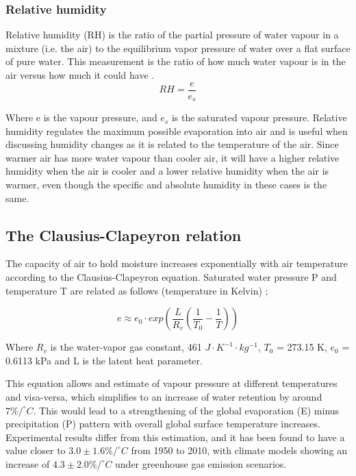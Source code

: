 \documentclass[12pt, oneside]{article}
\begin{document}
\subsubsection{Relative humidity}
Relative humidity (RH) is the ratio of the partial pressure of water vapour in a mixture (i.e. the air) to the equilibrium vapor pressure of water over a flat surface of pure water. This measurement is the ratio of how much water vapour is in the air versus how much it could have \cite[p.~92]{stull2015practical}.
\begin{equation}
    RH = \frac{e}{e_s}
\end{equation}

Where e is the vapour pressure, and $e_s$ is the saturated vapour pressure. Relative humidity regulates the maximum possible evaporation into air and is useful when discussing humidity changes as it is related to the temperature of the air. Since warmer air has more water vapour than cooler air, it will have a higher relative humidity when the air is cooler and a lower relative humidity when the air is warmer, even though the specific and absolute humidity in these cases is the same. 




\subsection{The Clausius-Clapeyron relation}\label{cc}
The capacity of air to hold moisture increases exponentially with air temperature according to the Clausius-Clapeyron equation. Saturated water pressure P and temperature T are related as follows (temperature in Kelvin) \cite[p.~88]{stull2015practical};

\begin{equation}
    e \approx e_0  \cdot exp  \left ( \frac{L}{R_v} \left (  \frac{1}{T_0} - \frac{1}{T}  \right ) \right )
\end{equation}

Where $R_v$ is the water-vapor gas constant, 461 $J \cdot K ^{-1} \cdot kg ^ {-1}$, $T_0$ = 273.15 K, $e_0$ = 0.6113 kPa and L is the latent heat parameter. 

This equation allows and estimate of vapour pressure at different temperatures and visa-versa, which simplifies to an increase of water retention by around $7\% / ^{\circ} C $. This would lead to a strengthening of the global evaporation (E) minus precipitation (P) pattern with overall global surface temperature increases\cite{held2006robust}. Experimental results differ from this estimation, and it has been found to have a value closer to $3.0 \pm 1.6 \% / ^{\circ} C $ from 1950 to 2010, with climate models showing an increase of $4.3 \pm 2.0 \% / ^{\circ} C $ under greenhouse gas emission scenarios\cite{Skliris2016}. 
\end{document}
